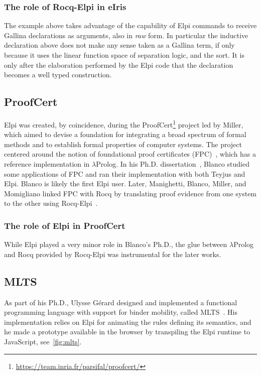 \documentclass{these-ISSS}
\begin{document}
\subsubsection{The role of Rocq-Elpi in eIris}
The example above takes advantage of the capability of Elpi commands to
receive Gallina declarations as arguments, also in \emph{raw} form.
In particular the inductive declaration above does not make any sense
taken as a Gallina term, if only because it uses the linear function
space of separation logic, and the  sort.
It is only after the elaboration performed by
the Elpi code that the declaration becomes a well typed construction.

\subsection{ProofCert}

Elpi was created, by coincidence, during the
ProofCert\footnote{\url{https://team.inria.fr/parsifal/proofcert/}}
project led by Miller, which aimed to devise a foundation for integrating a
broad spectrum of formal methods and to establish formal properties of computer
systems. The project centered around the notion of foundational proof
certificates (FPC)~\cite{Marek_2016}, which has a reference implementation in
$\lambda$Prolog. In his Ph.D. dissertation~\cite{rob}, Blanco studied some
applications of FPC and ran their implementation with both Teyjus and Elpi.
Blanco is likely the first Elpi user. Later, Manighetti, Blanco, Miller, and
Momigliano linked FPC with Rocq by translating proof evidence from one system
to the other using Rocq-Elpi~\cite{matteo,alberto}.

\subsubsection{The role of Elpi in ProofCert}

While Elpi played a very minor role in Blanco's Ph.D., the glue between
$\lambda$Prolog and Rocq provided by Rocq-Elpi was instrumental for the later
works.

\subsection{MLTS}

As part of his Ph.D., Ulysse G\'{e}rard designed and implemented a
functional programming language with support for binder mobility, called MLTS~\cite{mlts}.
His implementation relies on Elpi for animating the rules defining its
semantics, and he made a prototype available in the browser by transpiling
the Elpi runtime to JavaScript, see~\cref{fig:mlts}.
\end{document}
